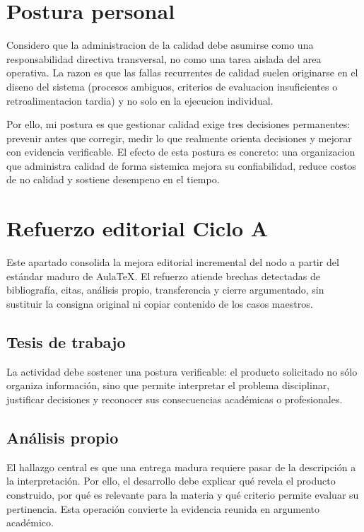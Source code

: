 \documentclass[
	spanish,
	letterpaper, oneside
]{article}
\begin{document}
\section{Postura personal}

Considero que la administracion de la calidad debe asumirse como una responsabilidad directiva transversal, no como una tarea aislada del area operativa. La razon es que las fallas recurrentes de calidad suelen originarse en el diseno del sistema (procesos ambiguos, criterios de evaluacion insuficientes o retroalimentacion tardia) y no solo en la ejecucion individual.

Por ello, mi postura es que gestionar calidad exige tres decisiones permanentes: prevenir antes que corregir, medir lo que realmente orienta decisiones y mejorar con evidencia verificable. El efecto de esta postura es concreto: una organizacion que administra calidad de forma sistemica mejora su confiabilidad, reduce costos de no calidad y sostiene desempeno en el tiempo.

\section*{Refuerzo editorial Ciclo A}
Este apartado consolida la mejora editorial incremental del nodo a partir del estándar maduro de AulaTeX. El refuerzo atiende brechas detectadas de bibliografía, citas, análisis propio, transferencia y cierre argumentado, sin sustituir la consigna original ni copiar contenido de los casos maestros.

\subsection*{Tesis de trabajo}
La actividad debe sostener una postura verificable: el producto solicitado no sólo organiza información, sino que permite interpretar el problema disciplinar, justificar decisiones y reconocer sus consecuencias académicas o profesionales.

\subsection*{Análisis propio}
El hallazgo central es que una entrega madura requiere pasar de la descripción a la interpretación. Por ello, el desarrollo debe explicar qué revela el producto construido, por qué es relevante para la materia y qué criterio permite evaluar su pertinencia. Esta operación convierte la evidencia reunida en argumento académico.
\end{document}
